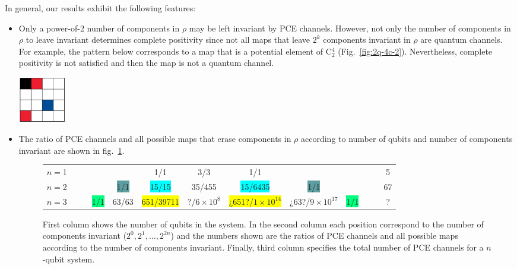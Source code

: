 \documentclass[11pt,dvipsnames]{article} %
\newcommand{\fref}[1]{fig.~\ref{#1}}  \newcommand{\tref}[1]{table~\ref{#1}}
\newcommand{\Fref}[1]{Fig.~\ref{#1}}  \newcommand{\Tref}[1]{Table~\ref{#1}}
\newcommand{\1}{\mathds{1}}
\begin{document}
In general, our results exhibit the following features:
\begin{itemize}
\item Only a power-of-2 number of components in $\rho$ 
may be left invariant by PCE 
channels. However, not only the number of components in $\rho$ 
to leave invariant determines complete positivity since
not all maps that leave $2^{k}$ components invariant in $\rho$
are quantum channels. For example, the pattern below corresponds 
to a map that is a potential element of C${}_2^4$ (\Fref{fig:2q-4c-2}).
Nevertheless, complete positivity is not satisfied 
and then the map is not a quantum channel. 
\begin{center}
	\includegraphics[height=2cm]{img/not-cc}
\end{center}

\item 
The ratio of PCE channels and all possible maps
that erase components in $\rho$ according to number of qubits 
and number of components
invariant are shown in \fref{fig:CCs-by-components}.


\begin{figure}[H]%
	\centering
	\begin{tabular}{>{$n=$}l<{\hfill}*{12}{c}}
1 &&&&&\colorbox{Apricot}{1/1}&3/3&\colorbox{Apricot}{1/1}&&&&&5\\
2 &&&&\colorbox{CadetBlue}{1/1}&\colorbox{Cyan}{15/15}&35/455&\colorbox{Cyan}{15/6435}&\colorbox{CadetBlue}{1/1}&&&&67\\
3 &&&\colorbox{SpringGreen}{1/1}&\colorbox{RedOrange}{63/63}&\colorbox{Yellow}{651/39711}&?/$6\times 10^8$&\colorbox{Yellow}{¿651?/$1\times 10^{14}$}&
\colorbox{RedOrange}{¿63?/$9\times 10^{17}$}&\colorbox{SpringGreen}{1/1}&&&?
\end{tabular}
\caption{First column shows the number of qubits in the system.  In the second
column each position correspond to the number of components invariant ($2^0,
2^1, \ldots, 2^{2n}$) and the numbers shown are the ratios of PCE channels
and all possible maps according to the number of components invariant.  Finally, third column
specifies the total number of PCE channels for a $n$-qubit system.}
\label{fig:CCs-by-components}
\end{figure} %


\end{itemize}
\end{document}
